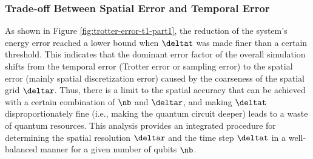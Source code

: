 \documentclass[manuscript_main.tex]{subfiles}
\begin{document}
\subsubsection{Trade-off Between Spatial Error and Temporal Error}
As shown in Figure \ref{fig:trotter-error-t1-part1}, the reduction of the
system's energy error reached a lower bound when $\deltat$ was made finer than a
certain threshold. This indicates that the dominant error factor of the overall
simulation shifts from the temporal error (Trotter error or sampling error) to
the spatial error (mainly spatial discretization error) caused by the coarseness
of the spatial grid $\deltar$. Thus, there is a limit to the spatial accuracy
that can be achieved with a certain combination of $\nb$ and $\deltar$, and
making $\deltat$ disproportionately fine (i.e., making the quantum circuit
deeper) leads to a waste of quantum resources. This analysis provides an
integrated procedure for determining the spatial resolution $\deltar$ and the
time step $\deltat$ in a well-balanced manner for a given number of qubits
$\nb$.


\ifSubfilesClassLoaded{}{}
\end{document}
